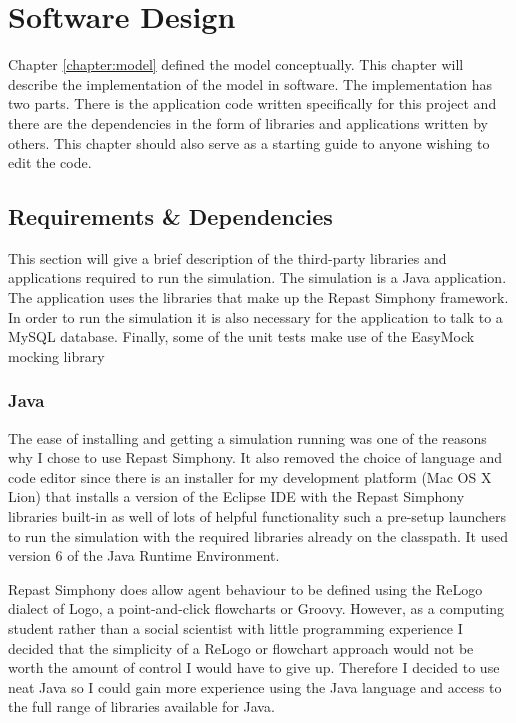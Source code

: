 \chapter{Software Design}\label{chapter:softwaredesign}

Chapter \ref{chapter:model} defined the model conceptually. This
chapter will describe the implementation of the model in software. The
implementation has two parts. There is the application code written
specifically for this project and there are the dependencies in the
form of libraries and applications written by others. This
chapter should also serve as a starting guide to anyone wishing to edit
the code.


\section{Requirements \& Dependencies}
This section will give a brief description of the third-party
libraries and applications required to run the simulation. The
simulation is a Java application. The application uses the libraries that make up the Repast Simphony
framework. In order to run the simulation it is also necessary for the
application to talk to a MySQL database. Finally, some of the unit 
tests make use of the EasyMock mocking library 

  \subsection{Java}
  The ease of installing and getting a simulation running was one of
  the reasons why I chose to use Repast Simphony. It also removed the
  choice of language and code editor since there is an
  installer for my development platform (Mac OS X Lion) that installs a version of the Eclipse IDE
  with the Repast Simphony libraries built-in as well of lots of
  helpful functionality such a pre-setup launchers to run the simulation
  with the required libraries already on the classpath. It used
  version 6 of the Java Runtime Environment.

  Repast Simphony does allow agent behaviour to be defined using the
  ReLogo dialect of Logo, a point-and-click flowcharts or
  Groovy. However, as a computing student rather than a social
  scientist with little programming experience I decided that the
  simplicity of a ReLogo or flowchart approach would not be worth the
  amount of control I would have to give up. Therefore I decided to use neat Java so I could gain more
  experience using the Java language and
  access to the full range of libraries available for Java.

